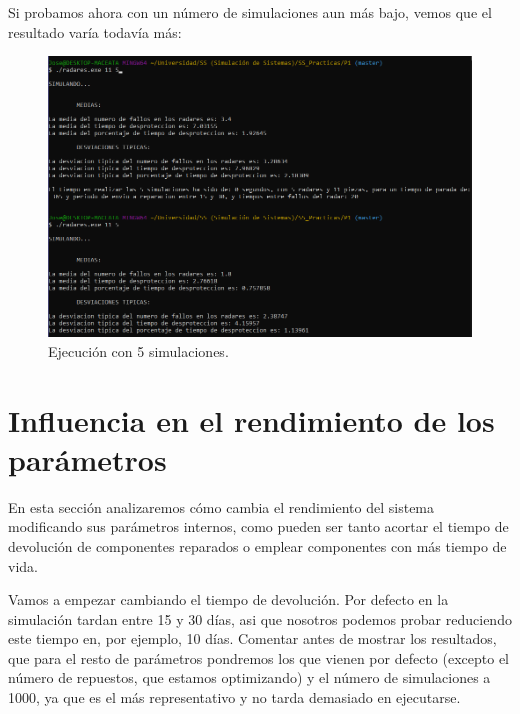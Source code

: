 \documentclass[11pt,a4paper]{report}
\begin{document}
Si probamos ahora con un número de simulaciones aun más bajo, vemos que el resultado varía todavía más:
\begin{figure}[H]
\centering
\includegraphics[scale=0.38]{img/sim5_radares.png}
\caption{Ejecución con 5 simulaciones.}
\end{figure}


\section{Influencia en el rendimiento de los parámetros}

En esta sección analizaremos cómo cambia el rendimiento del sistema modificando sus parámetros internos, como pueden ser tanto acortar
el tiempo de devolución de componentes reparados o emplear componentes con más tiempo de vida.

Vamos a empezar cambiando el tiempo de devolución. Por defecto en la simulación tardan entre 15 y 30 días, asi que nosotros podemos probar
reduciendo este tiempo en, por ejemplo, 10 días. Comentar antes de mostrar los resultados, que para el resto de parámetros pondremos los
que vienen por defecto (excepto el número de repuestos, que estamos optimizando) y el número de simulaciones a 1000, ya que es el más
representativo y no tarda demasiado en ejecutarse.
\end{document}
